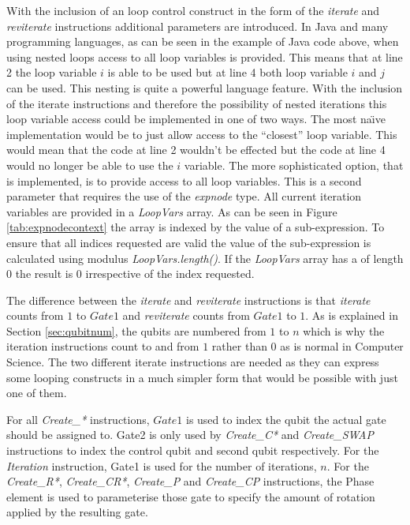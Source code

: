 With the inclusion of an loop control construct in the form of the \emph{iterate} and \emph{reviterate} instructions additional parameters are introduced.
In Java and many programming languages, as can be seen in the example of Java code above, when using nested loops access to all loop variables is provided.
This means that at line 2 the loop variable $i$ is able to be used but at line 4 both loop variable $i$ and $j$ can be used.
This nesting is quite a powerful language feature.
With the inclusion of the iterate instructions and therefore the possibility of nested iterations this loop variable access could be implemented in one of two ways.
The most na\"{\i}ve implementation would be to just allow access to the ``closest'' loop variable.
This would mean that the code at line 2 wouldn't be effected but the code at line 4 would no longer be able to use the $i$ variable.
The more sophisticated option, that is implemented, is to provide access to all loop variables.
This is a second parameter that requires the use of the \emph{expnode} type.
All current iteration variables are provided in a \emph{LoopVars} array.
As can be seen in Figure \ref{tab:expnodecontext} the array is indexed by the value of a sub-expression.
To ensure that all indices requested are valid the value of the sub-expression is calculated using modulus \emph{LoopVars.length()}.
If the \emph{LoopVars} array has a of length $0$ the result is $0$ irrespective of the index requested.

The difference between the \emph{iterate} and \emph{reviterate} instructions is that \emph{iterate} counts from $1$ to $Gate1$ and \emph{reviterate} counts from $Gate1$ to $1$.
As is explained in Section \ref{sec:qubitnum}, the qubits are numbered from $1$ to $n$ which is why the iteration instructions count to and from $1$ rather than $0$ as is normal in Computer Science.
The two different iterate instructions are needed as they can express some looping constructs in a much simpler form that would be possible with just one of them.

For all \emph{Create\_*} instructions, $Gate1$ is used to index the qubit the actual gate should be assigned to.
Gate2 is only used by \emph{Create\_C*} and \emph{Create\_SWAP} instructions to index the control qubit and second qubit respectively.
For the \emph{Iteration} instruction, Gate1 is used for the number of iterations, $n$.
For the \emph{Create\_R*}, \emph{Create\_CR*}, \emph{Create\_P} and  \emph{Create\_CP} instructions, the Phase element is used to parameterise those gate to specify the amount of rotation applied by the resulting gate.

